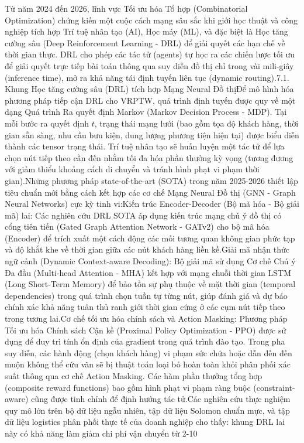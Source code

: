 \documentclass[13pt, a4paper]{extarticle} %
\begin{document}
Từ năm 2024 đến 2026, lĩnh vực Tối ưu hóa Tổ hợp (Combinatorial Optimization) chứng kiến một cuộc cách mạng sâu sắc khi giới học thuật và công nghiệp tích hợp Trí tuệ nhân tạo (AI), Học máy (ML), và đặc biệt là Học tăng cường sâu (Deep Reinforcement Learning - DRL) để giải quyết các hạn chế về thời gian thực. DRL cho phép các tác tử (agents) tự học ra các chiến lược tối ưu để giải quyết trực tiếp bài toán thông qua suy diễn đồ thị chỉ trong vài mili-giây (inference time), mở ra khả năng tái định tuyến liên tục (dynamic routing).7.1. Khung Học tăng cường sâu (DRL) tích hợp Mạng Neural Đồ thịĐể mô hình hóa phương pháp tiếp cận DRL cho VRPTW, quá trình định tuyến được quy về một dạng Quá trình Ra quyết định Markov (Markov Decision Process - MDP). Tại mỗi bước ra quyết định $t$, trạng thái mạng lưới (bao gồm tọa độ khách hàng, thời gian sẵn sàng, nhu cầu bưu kiện, dung lượng phương tiện hiện tại) được biểu diễn thành các tensor trạng thái. Trí tuệ nhân tạo sẽ huấn luyện một tác tử để lựa chọn nút tiếp theo cần đến nhằm tối đa hóa phần thưởng kỳ vọng (tương đương với giảm thiểu khoảng cách di chuyển và tránh hình phạt vi phạm thời gian).Những phương pháp state-of-the-art (SOTA) trong năm 2025-2026 thiết lập tiêu chuẩn mới bằng cách kết hợp các cơ chế Mạng Neural Đồ thị (GNN - Graph Neural Networks) cực kỳ tinh vi:Kiến trúc Encoder-Decoder (Bộ mã hóa - Bộ giải mã) lai: Các nghiên cứu DRL SOTA áp dụng kiến trúc mạng chú ý đồ thị có cổng tiên tiến (Gated Graph Attention Network - GATv2) cho bộ mã hóa (Encoder) để trích xuất một cách động các mối tương quan không gian phức tạp và độ khắt khe về thời gian giữa các nút khách hàng liền kề.Giải mã nhận thức ngữ cảnh (Dynamic Context-aware Decoding): Bộ giải mã sử dụng Cơ chế Chú ý Đa đầu (Multi-head Attention - MHA) kết hợp với mạng chuỗi thời gian LSTM (Long Short-Term Memory) để bảo tồn sự phụ thuộc về mặt thời gian (temporal dependencies) trong quá trình chọn tuần tự từng nút, giúp đánh giá và dự báo chính xác khả năng tuân thủ ranh giới thời gian cứng ở các cụm nút tiếp theo trong tương lai.Cơ chế tối ưu hóa chính sách và Action Masking: Phương pháp Tối ưu hóa Chính sách Cận kề (Proximal Policy Optimization - PPO) được sử dụng để duy trì tính ổn định của gradient trong quá trình đào tạo. Trong pha suy diễn, các hành động (chọn khách hàng) vi phạm sức chứa hoặc dẫn đến đến muộn không thể cứu vãn sẽ bị thuật toán loại bỏ hoàn toàn khỏi phân phối xác suất thông qua cơ chế Action Masking. Các hàm phần thưởng tổng hợp (composite reward functions) bao gồm hình phạt vi phạm ràng buộc (constraint-aware) cũng được tinh chỉnh để định hướng tác tử.Các nghiên cứu thực nghiệm quy mô lớn trên bộ dữ liệu ngẫu nhiên, tập dữ liệu Solomon chuẩn mực, và tập dữ liệu logistics phân phối thực tế của doanh nghiệp cho thấy: khung DRL lai này có khả năng làm giảm chi phí vận chuyển từ 2-10%
\end{document}
